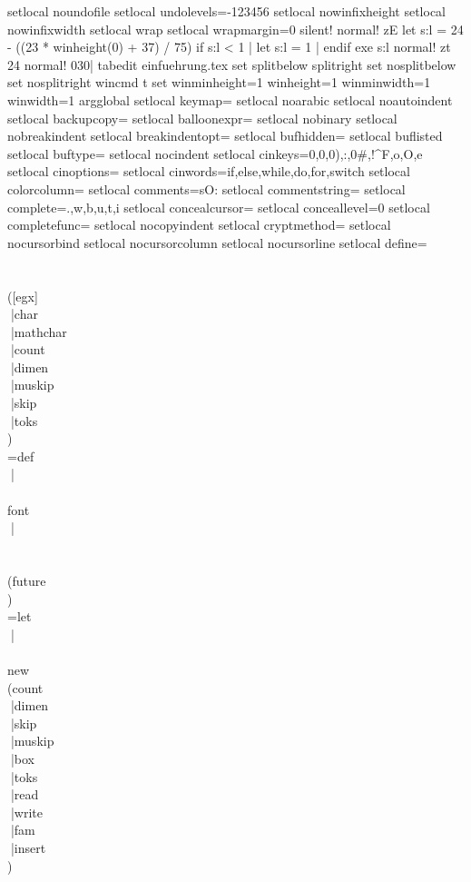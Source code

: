 {{{{setlocal noundofile
setlocal undolevels=-123456
setlocal nowinfixheight
setlocal nowinfixwidth
setlocal wrap
setlocal wrapmargin=0
silent! normal! zE
let s:l = 24 - ((23 * winheight(0) + 37) / 75)
if s:l < 1 | let s:l = 1 | endif
exe s:l
normal! zt
24
normal! 030|
tabedit einfuehrung.tex
set splitbelow splitright
set nosplitbelow
set nosplitright
wincmd t
set winminheight=1 winheight=1 winminwidth=1 winwidth=1
argglobal
setlocal keymap=
setlocal noarabic
setlocal noautoindent
setlocal backupcopy=
setlocal balloonexpr=
setlocal nobinary
setlocal nobreakindent
setlocal breakindentopt=
setlocal bufhidden=
setlocal buflisted
setlocal buftype=
setlocal nocindent
setlocal cinkeys=0{,0},0),:,0#,!^F,o,O,e
setlocal cinoptions=
setlocal cinwords=if,else,while,do,for,switch
setlocal colorcolumn=
setlocal comments=sO:%
setlocal commentstring=%
setlocal complete=.,w,b,u,t,i
setlocal concealcursor=
setlocal conceallevel=0
setlocal completefunc=
setlocal nocopyindent
setlocal cryptmethod=
setlocal nocursorbind
setlocal nocursorcolumn
setlocal nocursorline
setlocal define=\\\\\\([egx]\\|char\\|mathchar\\|count\\|dimen\\|muskip\\|skip\\|toks\\)\\=def\\|\\\\font\\|\\\\\\(future\\)\\=let\\|\\\\new\\(count\\|dimen\\|skip\\|muskip\\|box\\|toks\\|read\\|write\\|fam\\|insert\\)
}}}}
